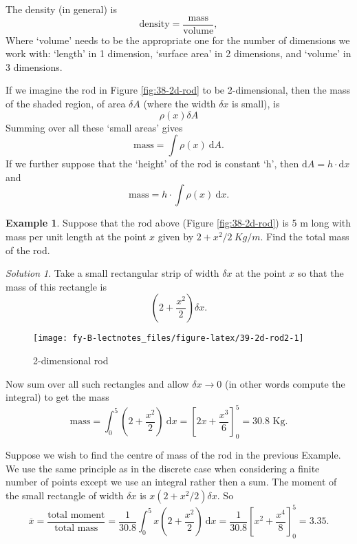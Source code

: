 \documentclass[
  english,
  11pt,
  oneside]{book}
\newcommand{\slide}{}
\theoremstyle{definition}
\theoremstyle{definition}
\newtheorem{example}{Example}[chapter]
\theoremstyle{definition}
\theoremstyle{definition}
\theoremstyle{remark}
\newtheorem*{solution}{Solution}
\begin{document}
The density (in general) is
\[
\text{density} = \frac{\text{mass}}{\text{volume}},
\]
Where `volume' needs to be the appropriate one for the number of dimensions we work with: `length' in 1 dimension, `surface area' in 2 dimensions, and `volume' in 3 dimensions.

\slide

If we imagine the rod in Figure \ref{fig:38-2d-rod} to be 2-dimensional, then
the mass of the shaded region, of area \(\delta A\) (where the width \(\delta x\) is small), is
\[
\rho(x)\delta A
\]
Summing over all these `small areas' gives
\[
\text{mass} = \int\rho(x)\ \mathrm{d}A.
\]
If we further suppose that the `height' of the rod is constant `h', then \(\mathrm{d}A=h\cdot\mathrm{d}x\) and
\[
\text{mass} = h\cdot \int\rho(x)\ \mathrm{d}x.
\]
\slide

\begin{example}
Suppose that the rod above (Figure \ref{fig:38-2d-rod}) is 5 m long with mass per unit length at the point \(x\) given by \(2+x^2/2\ Kg/m\). Find the total mass of the rod.
\end{example}

\begin{solution}
\leavevmode

Take a small rectangular strip of width \(\delta x\) at the point \(x\) so that the mass of this rectangle is
\[
\left(2+\frac{x^2}2\right)\delta x.
\]

\begin{figure}

{\centering \texttt{[image: fy-B-lectnotes\_files/figure-latex/39-2d-rod2-1]} 

}

\caption{2-dimensional rod}\label{fig:39-2d-rod2}
\end{figure}

Now sum over all such rectangles and allow \(\delta x \to 0\) (in other words compute the integral) to get the mass
\[
\text{mass} = \int_0^5\left(2+\frac{x^2}{2}\right)\ \mathrm{d}x = \left[2x+\frac{x^3}{6}\right]_0^5 = 30.8\text{ Kg}.
\]

\end{solution}

\slide

\begin{notslides}

Suppose we wish to find the centre of mass of the rod in the previous Example. We use the same principle as in the discrete case when considering a finite number of points except we use an integral rather then a sum. The moment of the small rectangle of width \(\delta x\) is \(x(2+x^2/2)\delta x\). So
\[
\overline x = \frac{\text{total moment}}{\text{total mass}} = \frac{1}{30.8}\int_0^5 x(2+\frac{x^2}{2})\ \mathrm{d}x = \frac{1}{30.8}\left[x^2+\frac{x^4}{8}\right]_0^5 = 3.35.
\]

\end{notslides}
\end{document}

